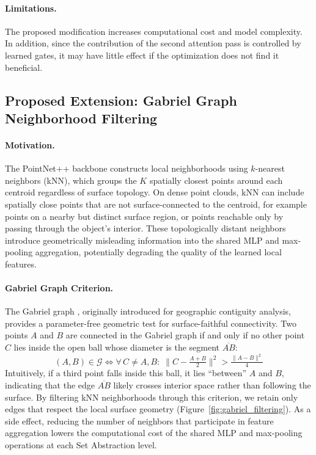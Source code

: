 \paragraph{Limitations.}
The proposed modification increases computational cost and model complexity. In addition, since the contribution of the second attention pass is controlled by learned gates, it may have little effect if the optimization does not find it beneficial.

\subsection{Proposed Extension: Gabriel Graph Neighborhood Filtering}
\label{sec:gabriel_method}

\paragraph{Motivation.}
The PointNet++ backbone constructs local neighborhoods using $k$-nearest neighbors (kNN), which groups the $K$ spatially closest points around each centroid regardless of surface topology. On dense point clouds, kNN can include spatially close points that are not surface-connected to the centroid, for example points on a nearby but distinct surface region, or points reachable only by passing through the object's interior. These topologically distant neighbors introduce geometrically misleading information into the shared MLP and max-pooling aggregation, potentially degrading the quality of the learned local features.

\paragraph{Gabriel Graph Criterion.}
The Gabriel graph \cite{gabriel1969new}, originally introduced for geographic contiguity analysis, provides a parameter-free geometric test for surface-faithful connectivity. Two points $A$ and $B$ are connected in the Gabriel graph if and only if no other point $C$ lies inside the open ball whose diameter is the segment $\overline{AB}$:
\begin{equation}
\label{eq:gabriel_criterion}
(A, B) \in \mathcal{G} \iff \forall\, C \neq A, B: \; \|C - \tfrac{A+B}{2}\|^2 > \tfrac{\|A-B\|^2}{4}
\end{equation}
Intuitively, if a third point falls inside this ball, it lies ``between'' $A$ and $B$, indicating that the edge $\overline{AB}$ likely crosses interior space rather than following the surface. By filtering kNN neighborhoods through this criterion, we retain only edges that respect the local surface geometry (Figure~\ref{fig:gabriel_filtering}). As a side effect, reducing the number of neighbors that participate in feature aggregation lowers the computational cost of the shared MLP and max-pooling operations at each Set Abstraction level.

